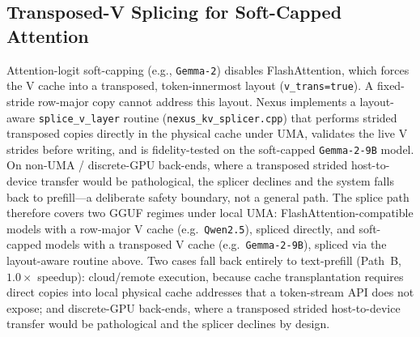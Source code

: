 \documentclass[10pt,conference]{IEEEtran}
\newcommand{\code}[1]{\texttt{\small #1}}
\begin{document}
\subsection{Transposed-V Splicing for Soft-Capped Attention}
\label{sec:vtrans}
Attention-logit soft-capping (e.g., \code{Gemma-2}) disables FlashAttention, which forces the V cache
into a transposed, token-innermost layout (\code{v\_trans=true}). A fixed-stride row-major copy
cannot address this layout. Nexus implements a layout-aware \code{splice\_v\_layer} routine
(\code{nexus\_kv\_splicer.cpp}) that performs strided transposed copies directly in the physical
cache under UMA, validates the live V strides before writing, and is fidelity-tested on the
soft-capped \code{Gemma-2-9B} model. On non-UMA / discrete-GPU
back-ends, where a transposed strided host-to-device transfer would be pathological, the splicer
declines and the system falls back to prefill---a deliberate safety boundary, not a general path.
The splice path therefore covers two GGUF regimes under local UMA: FlashAttention-compatible models
with a row-major V cache (e.g.\ \code{Qwen2.5}), spliced directly, and soft-capped models with a
transposed V cache (e.g.\ \code{Gemma-2-9B}), spliced via the layout-aware routine above. Two cases
fall back entirely to text-prefill (Path~B, $1.0\times$ speedup): cloud/remote execution, because
cache transplantation requires direct copies into local physical cache addresses that a token-stream
API does not expose; and discrete-GPU back-ends, where a transposed strided host-to-device transfer
would be pathological and the splicer declines by design.
\end{document}
